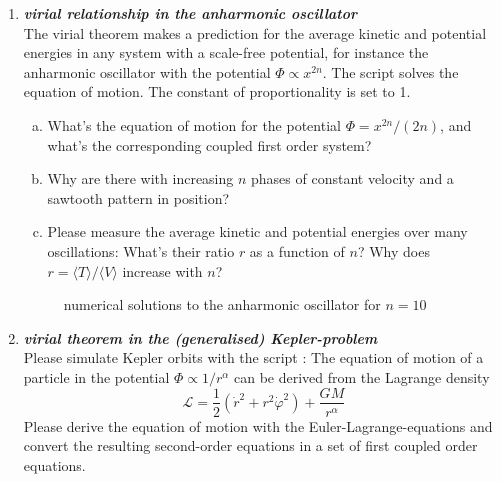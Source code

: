 \documentclass[a4paper,12pt]{article}
\newcommand{\question}[1]{\textbf{\textit{#1}}}
\newcommand{\bra}{\langle}
\newcommand{\ket}{\rangle}
\begin{document}
\begin{enumerate}
\item \question{virial relationship in the anharmonic oscillator}\\
The virial theorem makes a prediction for the average kinetic and potential energies in any system with a scale-free potential, for instance the anharmonic oscillator with the potential $\Phi\propto x^{2n}$. The script  solves the equation of motion. The constant of proportionality is set to 1.
\begin{enumerate}[(a)]
\item{What's the equation of motion for the potential $\Phi=x^{2n}/(2n)$, and what's the corresponding coupled first order system?}
\item{Why are there with increasing $n$ phases of constant velocity and a sawtooth pattern in position?}
\item{Please measure the average kinetic and potential energies over many oscillations: What's their ratio $r$ as a function of $n$? Why does $r=\bra T\ket/\bra V\ket$ increase with $n$?}
\end{enumerate}

\begin{figure}[h]
\begin{center}
\caption{numerical solutions to the anharmonic oscillator for $n=10$}
\end{center}
\end{figure}


\item \question{virial theorem in the (generalised) Kepler-problem}\\
Please simulate Kepler orbits with the script : The equation of motion of a particle in the potential $\Phi\propto 1/r^\alpha$ can be derived from the Lagrange density
\begin{equation}
\mathcal{L} = \frac{1}{2}\left(\dot{r}^2+r^2\dot{\varphi}^2\right) + \frac{GM}{r^\alpha}
\end{equation}
Please derive the equation of motion with the Euler-Lagrange-equations and convert the resulting second-order equations in a set of first coupled order equations.


\end{enumerate}
\end{document}
